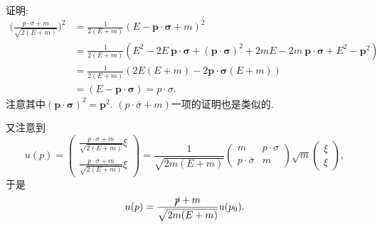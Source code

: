 \begin{enumerate}
        证明:
        \begin{equation}
          \begin{aligned}
            \biggl(\frac{p\cdot \sigma + m}{\sqrt{2(E+m)}}\biggr)^2 & = \frac{1}{2(E+m)}(E-\mathbf{p}\cdot \bm{\sigma}+m)^2                                                                                                    \\
                                                                    & = \frac{1}{2(E+m)}(E^2 - 2E\ \mathbf{p}\cdot \bm{\sigma} + (\mathbf{p}\cdot \bm{\sigma})^2 + 2mE - 2m\ \mathbf{p}\cdot \bm{\sigma} + E^2 - \mathbf{p}^2) \\
                                                                    & = \frac{1}{2(E+m)} (2E(E + m) - 2\mathbf{p}\cdot \bm{\sigma}(E + m))                                                                                     \\
                                                                    & = (E - \mathbf{p}\cdot \bm{\sigma}) = p\cdot \sigma.
          \end{aligned}
        \end{equation}
        注意其中$(\mathbf{p}\cdot \bm{\sigma})^2 = \mathbf{p}^2$.
        $(p\cdot \bar{\sigma} + m)$一项的证明也是类似的.

        又注意到
        \begin{equation}
          u(p)=\begin{pmatrix}
            \frac{p\cdot \sigma + m}{\sqrt{2(E+m)}}\xi \\
            \frac{p\cdot \bar{\sigma} + m}{\sqrt{2(E+m)}}\xi
          \end{pmatrix}
          =\frac{1}{\sqrt{2m(E+m)}}\begin{pmatrix}
            m                   & p\cdot \sigma \\
            p\cdot \bar{\sigma} & m
          \end{pmatrix}
          \sqrt{m}
          \begin{pmatrix}
            \xi \\
            \xi
          \end{pmatrix},
        \end{equation}
        于是
        \begin{equation}
          u(p) = \frac{\cancel{p}+m}{\sqrt{2m(E+m)}}u(p_0).
        \end{equation}
\end{enumerate}


